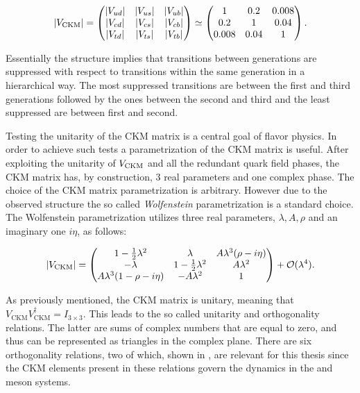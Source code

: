 \begin{equation}
  |V_{\text{CKM}}|
                   = \begin{pmatrix} |V_{ud}| & |V_{us}| & |V_{ub}| \\ |V_{cd}| & |V_{cs}| & |V_{cb}| \\ |V_{td}| & |V_{ts}| & |V_{tb}| \end{pmatrix}
              \simeq \begin{pmatrix} 1 & 0.2 & 0.008 \\ 0.2 & 1 & 0.04 \\ 0.008 & 0.04 & 1 \end{pmatrix}.
      \label{CKMmatrix}
  \end{equation}

\noindent Essentially the structure implies that transitions between generations
are suppressed with respect to transitions within the same generation in a hierarchical way. The most suppressed transitions are between
the first and third generations followed by the ones between the second and third and the least suppressed are between first and second.

Testing the unitarity of the CKM matrix is a central goal of flavor physics. In order to achieve such tests a
parametrization of the CKM matrix is useful. After exploiting the unitarity of $V_{\rm CKM}$ and all the
redundant quark field phases, the CKM matrix has, by construction, 3 real parameters and one complex phase.
The choice of the CKM matrix parametrization is \aprior arbitrary. However due to the observed structure the so called
{\it Wolfenstein} \cite{Wolfenstein:1983yz,Buras-wolfenstein} parametrization is a standard choice.
The Wolfenstein parametrization utilizes three real parameters, $\lambda,A,\rho$ and an imaginary one $i\eta$, as follows:

\begin{equation}
\centering
  |V_{\text{CKM}}|
                   = \begin{pmatrix} \VudWolf & \VusWolf & \VubWolf \\
                                     \VcdWolf & \VcsWolf & \VcbWolf \\
                                     \VtdWolf & \VtsWolf & \VtbWolf \end{pmatrix} + \mathcal{O}(\lambda^4).
      \label{CKMwolfenstein}
\end{equation}

\noindent As previously mentioned, the CKM matrix is unitary, meaning that $V_{\text{CKM}} V_{\text{CKM}}^\dagger = I_{3\times3}$.
This leads to the so called unitarity and orthogonality relations. The latter are sums of complex numbers that are equal to zero,
and thus can be represented as triangles in the complex plane. There are six orthogonality relations, two of which, shown
in , are relevant for this thesis since the CKM elements present in these relations govern the
dynamics in the \Bs and \Bd meson systems.

